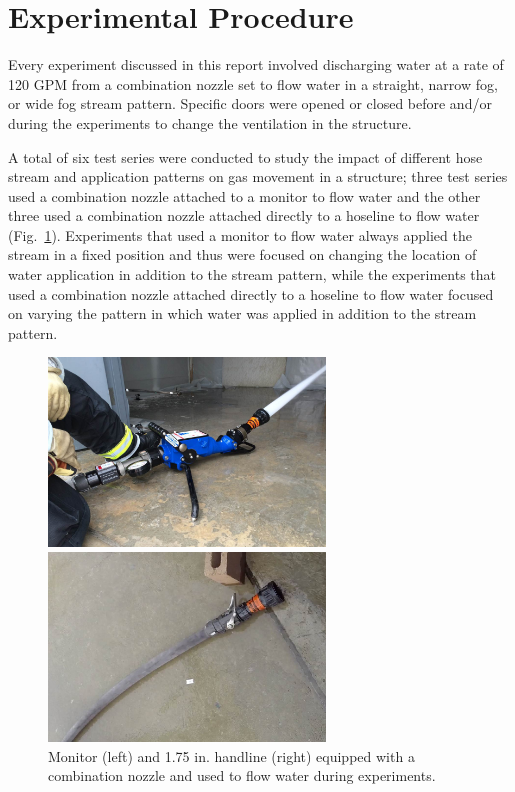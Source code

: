 \documentclass[12pt,oneside]{book}
\begin{document}
\section{Experimental Procedure}
\label{sec:exp_procedure}
Every experiment discussed in this report involved discharging water at a rate of 120 GPM from a combination nozzle set to flow water in a straight, narrow fog, or wide fog stream pattern. Specific doors were opened or closed before and/or during the experiments to change the ventilation in the structure. 

A total of six test series were conducted to study the impact of different hose stream and application patterns on gas movement in a structure; three test series used a combination nozzle attached to a monitor to flow water and the other three used a combination nozzle attached directly to a hoseline to flow water (Fig.~\ref{fig:monitor+handline}). Experiments that used a monitor to flow water always applied the stream in a fixed position and thus were focused on changing the location of water application in addition to the stream pattern, while the experiments that used a combination nozzle attached directly to a hoseline to flow water focused on varying the pattern in which water was applied in addition to the stream pattern.

\begin{figure}[!ht]
\minipage{3in}
\begin{center}
	\includegraphics[width=2.9in]{../Pictures/monitor}
\end{center} 
\endminipage \hfill
\minipage{3in}
\begin{center}
	\includegraphics[width=2.9in]{../Pictures/handline}
\end{center}
\endminipage \hfill
\caption[Monitor and handline equipped with a combination nozzle.]{Monitor (left) and 1.75 in. handline (right) equipped with a combination nozzle and used to flow water during experiments.}
\label{fig:monitor+handline}
\end{figure}
\FloatBarrier
\end{document}
